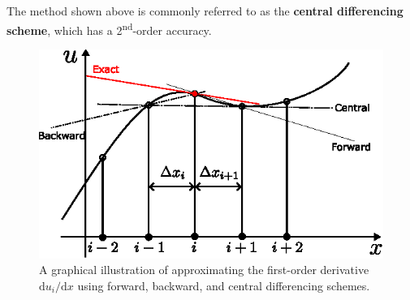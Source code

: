\documentclass[a4paper]{article}
\begin{document}
\begin{tcolorbox}[title = Numerical Solution Procedure, breakable]
The method shown above is commonly referred to as the \textbf{central differencing scheme}, which has a 2\textsuperscript{nd}-order accuracy.
\begin{figure}[H]
    \centering
    \includegraphics[width=.6\textwidth]{img/def-of-derivative.eps}
    \caption{A graphical illustration of approximating the first-order derivative $\mathrm{d}u_i/\mathrm{d}x$ using forward, backward, and central differencing schemes.}
    \label{fig:schemes}
\end{figure}


\end{tcolorbox}
\end{document}
